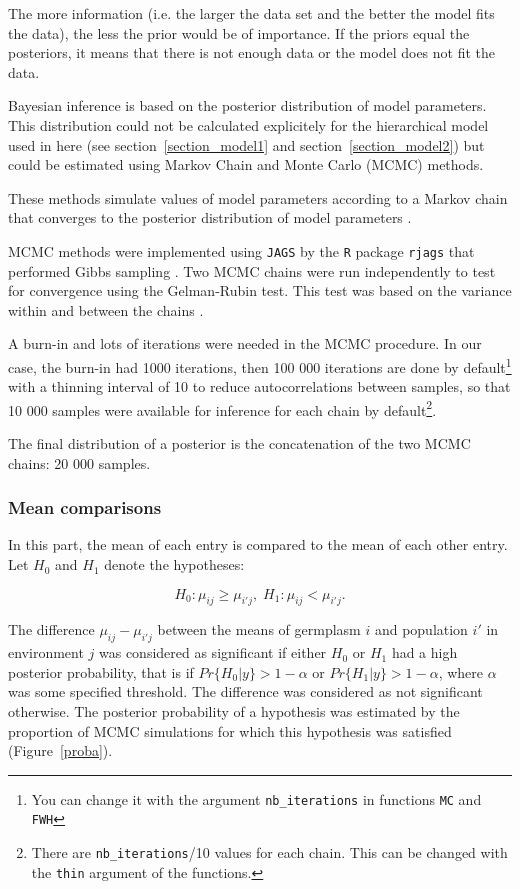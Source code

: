 \documentclass{article}\usepackage[]{graphicx}\usepackage[]{color}
\begin{document}
The more information (i.e. the larger the data set and the better the model fits the data), the less the prior would be of importance.
If the priors equal the posteriors, it means that there is not enough data or the model does not fit the data.


Bayesian inference is based on the posterior distribution of model parameters.
This distribution could not be calculated explicitely for the hierarchical model used in here (see section~\ref{section_model1} and section~\ref{section_model2}) but could be estimated using Markov Chain and Monte Carlo (MCMC) methods.

These methods simulate values of model parameters according to a Markov chain that converges to the posterior distribution of model parameters \citep{robert_bayesian_2001}.

MCMC methods were implemented using \texttt{JAGS} by the \texttt{R} package \texttt{rjags} that performed Gibbs sampling \citep{robert_bayesian_2001}.
Two MCMC chains were run independently to test for convergence using the Gelman-Rubin test.
This test was based on the variance within and between the chains \citep{gelman_inference_1992}.

A burn-in and lots of iterations were needed in the MCMC procedure.
In our case, the burn-in had 1000 iterations, then 100 000 iterations are done by default\footnote{You can change it with the argument \texttt{nb\_iterations} in functions \texttt{MC} and \texttt{FWH}} with a thinning interval of 10 to reduce autocorrelations between samples, so that 10 000 samples were available for inference for each chain by default\footnote{There are \texttt{nb\_iterations}/10 values for each chain. This can be changed with the \texttt{thin} argument of the functions.}.
 
The final distribution of a posterior is the concatenation of the two MCMC chains: 20 000 samples.


\subsubsection{Mean comparisons}
\label{mean_comp}
In this part, the mean of each entry is compared to the mean of each other entry.
Let $H_{0}$ and $H_{1}$ denote the hypotheses:

\begin{displaymath}
  H_{0} : \mu_{ij} \ge \mu_{i'j} , \; H_{1} : \mu_{ij} < \mu_{i'j}.
\end{displaymath}

The difference $\mu_{ij}-\mu_{i'j}$ between the means of germplasm $i$ and population $i'$ in environment $j$ was considered as significant if either $H_{0}$ or $H_{1}$ had a high posterior probability, that is if $Pr\{H_{0}|y\} > 1 - \alpha$ or $Pr\{H_{1}|y\}> 1 - \alpha$, where
$\alpha$ was some specified threshold.
The difference was considered as not significant otherwise.
The posterior probability of a hypothesis was estimated by the proportion of MCMC simulations for
which this hypothesis was satisfied (Figure~\ref{proba}).
\end{document}

